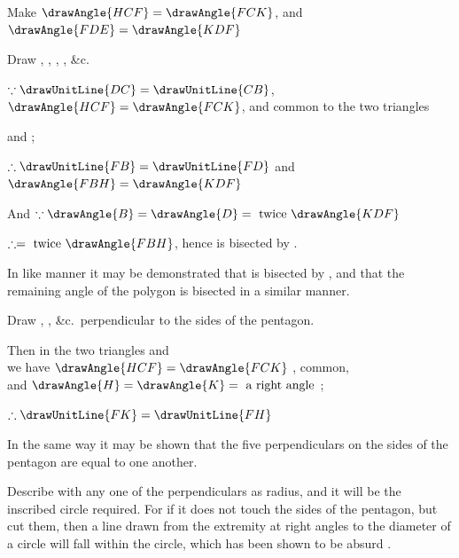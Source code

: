 \documentclass[booklanguage=english]{byrnebook}
\begin{document}
\begin{center}
Make $\drawAngle{HCF} = \drawAngle{FCK}$, and $\drawAngle{FDE} = \drawAngle{KDF}$ 

Draw , , , , \&c.

$\because \drawUnitLine{DC} = \drawUnitLine{CB}$, $\drawAngle{HCF} = \drawAngle{FCK}$, and  common to the two triangles %

and
;

$\therefore \drawUnitLine{FB} = \drawUnitLine{FD}$ and $\drawAngle{FBH} = \drawAngle{KDF}$ 

And $\because \drawAngle{B} = \drawAngle{D} = \mbox{ twice } \drawAngle{KDF}$ %

$\therefore = \mbox{ twice } \drawAngle{FBH}$, hence  is bisected by .

In like manner it may be demonstrated that  is bisected by , and that the remaining angle of the polygon is bisected in a similar manner.

Draw , , \&c.\ perpendicular to the sides of the pentagon.

Then in the two triangles
and
\\
we have $\drawAngle{HCF} = \drawAngle{FCK}$ \byref{\constref},  common,\\
and $\drawAngle{H} = \drawAngle{K} = \mbox{ a right angle }$;

$\therefore \drawUnitLine{FK} = \drawUnitLine{FH}$ 
\end{center}

In the same way it may be shown that the five perpendiculars on the sides of the pentagon are equal to one another.

Describe  with any one of the perpendiculars as radius, and it will be the inscribed circle required. For if it does not touch the sides of the pentagon, but cut them, then a line drawn from the extremity at right angles to the diameter of a circle will fall within the circle, which has been shown to be absurd .
\end{document}
